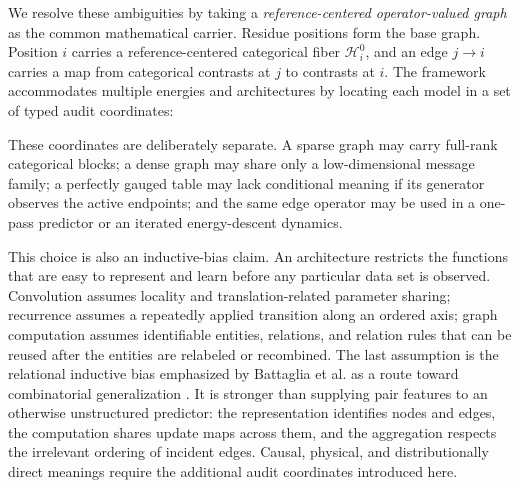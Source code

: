 \documentclass[10pt]{article}
\theoremstyle{definition}
\theoremstyle{remark}
\begin{document}
We resolve these ambiguities by taking a \emph{reference-centered operator-valued graph} as the
common mathematical carrier.  Residue positions form the base graph.  Position $i$ carries a
reference-centered categorical fiber $\mathcal H_i^0$, and an edge $j\to i$ carries a map from
categorical contrasts at $j$ to contrasts at $i$.  The framework accommodates multiple energies and
architectures by locating each model in a set of typed audit coordinates:
\begin{center}
\end{center}
These coordinates are deliberately separate.  A sparse graph may carry full-rank categorical blocks; a dense graph may
share only a low-dimensional message family; a perfectly gauged table may lack conditional meaning
if its generator observes the active endpoints; and the same edge operator may be used in a
one-pass predictor or an iterated energy-descent dynamics.

This choice is also an inductive-bias claim.  An architecture restricts the functions that are
easy to represent and learn before any particular data set is observed.  Convolution assumes
locality and translation-related parameter sharing; recurrence assumes a repeatedly applied
transition along an ordered axis; graph computation assumes identifiable entities, relations, and
relation rules that can be reused after the entities are relabeled or recombined.  The last
assumption is the relational inductive bias emphasized by Battaglia et al. as a route toward
combinatorial generalization \cite{battaglia2018relational}.  It is stronger than supplying pair
features to an otherwise unstructured predictor: the representation identifies nodes and edges,
the computation shares update maps across them, and the aggregation respects the irrelevant
ordering of incident edges.  Causal, physical, and distributionally direct meanings require the
additional audit coordinates introduced here.
\end{document}

